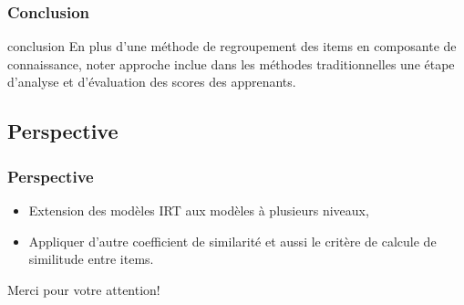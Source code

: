 \documentclass[aspectratio=169,professionalfonts, 12pt]{beamer}
\begin{document}
\begin{frame}
  \frametitle{Conclusion}
  \justifying 
  \begin{minipage}{\textwidth}
    \begin{block}{conclusion}
      En plus d’une méthode de regroupement des items en composante de connaissance, noter approche inclue dans les méthodes traditionnelles une étape d’analyse et d’évaluation des scores des apprenants.
    \end{block}
  \end{minipage}
\end{frame}


\subsection{Perspective}

\begin{frame}
  \frametitle{Perspective}
  \justifying 
  \begin{minipage}{\textwidth}
    \begin{itemize}
      \item Extension des modèles IRT aux modèles à plusieurs niveaux,
      \item Appliquer d’autre coefficient de similarité et aussi le critère de calcule de similitude entre items.
    \end{itemize}
  \end{minipage}
\end{frame}

\begin{frame}[plain,c]
  \begin{center}
  \Huge Merci pour votre attention!
  \end{center}
\end{frame}
\end{document}
